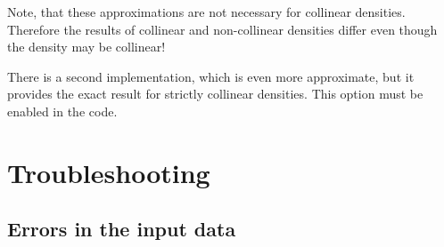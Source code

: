 \documentclass[final,12pt]{article}
\begin{document}
{{{{{{Note, that these approximations are not necessary for collinear
densities. Therefore the results of collinear and non-collinear
densities differ even though the density may be collinear!

There is a second implementation, which is even more approximate, but
it provides the exact result for strictly collinear densities. This
option must be enabled in the code.




\newpage
\section{Troubleshooting}

\subsection{Errors in the input data}

}}}}}}
\end{document}
